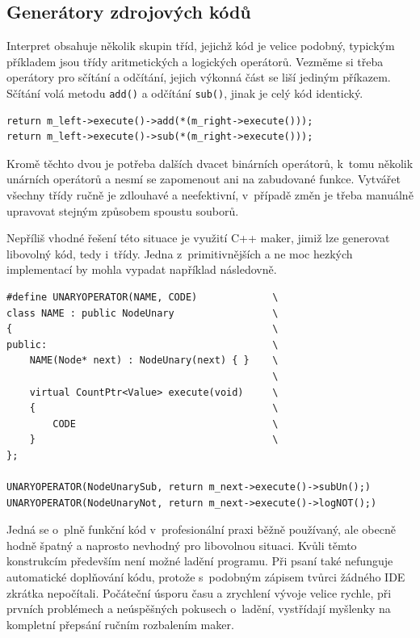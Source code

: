 \documentclass[11pt,twoside,a4paper]{book}
\begin{document}
\subsection{Generátory zdrojových kódů}

Interpret obsahuje několik skupin tříd, jejichž kód je velice podobný, typickým příkladem jsou třídy aritmetických a logických operátorů. Vezměme si třeba operátory pro sčítání a odčítání, jejich výkonná část se liší jediným příkazem. Sčítání volá metodu \texttt{add()} a odčítání \texttt{sub()}, jinak je celý kód identický.

\begin{verbatim}
return m_left->execute()->add(*(m_right->execute()));
return m_left->execute()->sub(*(m_right->execute()));
\end{verbatim}

Kromě těchto dvou je potřeba dalších dvacet binárních operátorů, k~tomu několik unárních operátorů a nesmí se zapomenout ani na zabudované funkce. Vytvářet všechny třídy ručně je zdlouhavé a neefektivní, v~případě změn je třeba manuálně upravovat stejným způsobem spoustu souborů.

Nepříliš vhodné řešení této situace je využití C++ maker, jimiž lze generovat libovolný kód, tedy i~třídy. Jedna z~primitivnějších a ne moc hezkých implementací by mohla vypadat například následovně.

\begin{verbatim}
#define UNARYOPERATOR(NAME, CODE)             \
class NAME : public NodeUnary                 \
{                                             \
public:                                       \
    NAME(Node* next) : NodeUnary(next) { }    \
                                              \
    virtual CountPtr<Value> execute(void)     \
    {                                         \
        CODE                                  \
    }                                         \
};

UNARYOPERATOR(NodeUnarySub, return m_next->execute()->subUn();)
UNARYOPERATOR(NodeUnaryNot, return m_next->execute()->logNOT();)
\end{verbatim}

Jedná se o~plně funkční kód v~profesionální praxi běžně používaný, ale obecně hodně špatný a naprosto nevhodný pro libovolnou situaci. Kvůli těmto konstrukcím především není možné ladění programu. Při psaní také nefunguje automatické do\-pl\-ňo\-vá\-ní kódu, protože s~podobným zápisem tvůrci žádného IDE zkrátka nepočítali. Počáteční úsporu času a zrychlení vývoje velice rychle, při prvních problémech a neúspěšných pokusech o~ladění, vystřídají myšlenky na kompletní přepsání ručním rozbalením maker.
\end{document}
